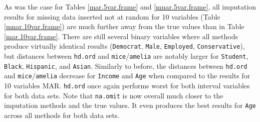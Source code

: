 \documentclass[12pt,econ]{sources/authesis}
\begin{document}
\normalsize

As was the case for Tables \ref{mar.5var.frame} and \ref{mnar.5var.frame}, all imputation results for missing data inserted not at random for 10 variables (Table \ref{mnar.10var.frame}) are much further away from the true values than in Table \ref{mar.10var.frame}. There are still several binary variables where all methods produce virtually identical results (\texttt{Democrat}, \texttt{Male}, \texttt{Employed}, \texttt{Conservative}), but distances between \texttt{hd.ord} and \texttt{mice}/\texttt{amelia} are notably larger for \texttt{Student}, \texttt{Black}, \texttt{Hispanic}, and \texttt{Asian}. Similarly to before, the distances between \texttt{hd.ord} and \texttt{mice}/\texttt{amelia} decrease for \texttt{Income} and \texttt{Age} when compared to the results for 10 variables MAR. \texttt{hd.ord} once again performs worst for both interval variables for both data sets. Note that \texttt{na.omit} is now overall much closer to the imputation methods and the true values. It even produces the best results for \texttt{Age} across all methods for both data sets.

\ssp
\end{document}
